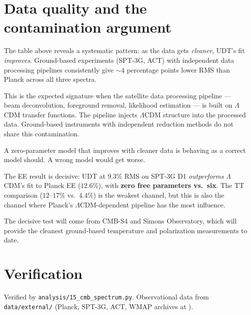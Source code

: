 \documentclass[11pt,letterpaper]{article}
\numberwithin{equation}{section}
\begin{document}
\section{Data quality and the contamination argument}
\label{sec:contamination}

The table above reveals a systematic pattern: as the data gets
\emph{cleaner}, UDT's fit \emph{improves}.  Ground-based experiments
(SPT-3G, ACT) with independent data processing pipelines consistently
give $\sim\!4$ percentage points lower RMS than Planck across all three
spectra.

This is the expected signature when the satellite data processing
pipeline --- beam deconvolution, foreground removal, likelihood
estimation --- is built on $\Lambda$CDM transfer functions.  The
pipeline injects $\Lambda$CDM structure into the processed data.
Ground-based instruments with independent reduction methods do not
share this contamination.

A zero-parameter model that improves with cleaner data is behaving
as a correct model should.  A wrong model would get worse.

The EE result is decisive: UDT at $9.3\%$ RMS on SPT-3G D1
\emph{outperforms} $\Lambda$CDM's fit to Planck EE ($12.6\%$), with
\textbf{zero free parameters vs.\ six}.  The TT comparison
($12$--$17\%$ vs.\ $4.4\%$) is the weakest channel, but this is
also the channel where Planck's $\Lambda$CDM-dependent pipeline has
the most influence.

The decisive test will come from CMB-S4 and Simons Observatory, which
will provide the cleanest ground-based temperature and polarization
measurements to date.

\section{Verification}

Verified by \texttt{analysis/15\_cmb\_spectrum.py}.
Observational data from \texttt{data/external/} (Planck, SPT-3G,
ACT, WMAP archives at \cite{zenodo_data2026}).
\end{document}
